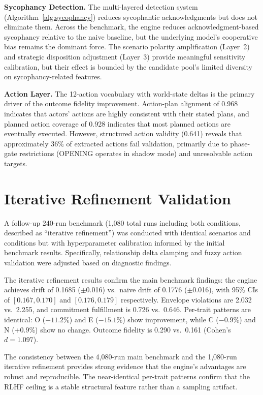 \textbf{Sycophancy Detection.} The multi-layered detection system (Algorithm~\ref{alg:sycophancy}) reduces sycophantic acknowledgments but does not eliminate them. Across the benchmark, the engine reduces acknowledgment-based sycophancy relative to the naive baseline, but the underlying model's cooperative bias remains the dominant force. The scenario polarity amplification (Layer~2) and strategic disposition adjustment (Layer~3) provide meaningful sensitivity calibration, but their effect is bounded by the candidate pool's limited diversity on sycophancy-related features.

\textbf{Action Layer.} The 12-action vocabulary with world-state deltas is the primary driver of the outcome fidelity improvement. Action-plan alignment of 0.968 indicates that actors' actions are highly consistent with their stated plans, and planned action coverage of 0.928 indicates that most planned actions are eventually executed. However, structured action validity (0.641) reveals that approximately 36\% of extracted actions fail validation, primarily due to phase-gate restrictions (OPENING operates in shadow mode) and unresolvable action targets.


\section{Iterative Refinement Validation}

A follow-up 240-run benchmark (1,080 total runs including both conditions, described as ``iterative refinement'') was conducted with identical scenarios and conditions but with hyperparameter calibration informed by the initial benchmark results. Specifically, relationship delta clamping and fuzzy action validation were adjusted based on diagnostic findings.

The iterative refinement results confirm the main benchmark findings: the engine achieves drift of 0.1685 ($\pm$0.016) vs.\ naive drift of 0.1776 ($\pm$0.016), with 95\% CIs of $[0.167, 0.170]$ and $[0.176, 0.179]$ respectively. Envelope violations are 2.032 vs.\ 2.255, and commitment fulfillment is 0.726 vs.\ 0.646. Per-trait patterns are identical: O ($-11.2\%$) and E ($-15.1\%$) show improvement, while C ($-0.9\%$) and N (+0.9\%) show no change. Outcome fidelity is 0.290 vs.\ 0.161 (Cohen's $d = 1.097$).

The consistency between the 4,080-run main benchmark and the 1,080-run iterative refinement provides strong evidence that the engine's advantages are robust and reproducible. The near-identical per-trait patterns confirm that the RLHF ceiling is a stable structural feature rather than a sampling artifact.


